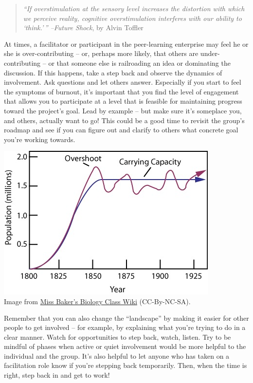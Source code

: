 \begin{quote}
\emph{``If overstimulation at the sensory level increases the distortion
with which we perceive reality, cognitive overstimulation interferes
with our ability to `think.'\,'' --}\emph{Future Shock}, by Alvin
Toffler
\end{quote}

At times, a facilitator or participant in the peer-learning enterprise
may feel he or she is over-contributing -- or, perhaps more likely, that
others are under-contributing -- or that someone else is railroading an
idea or dominating the discussion. If this happens, take a step back and
observe the dynamics of involvement. Ask questions and let others
answer. Especially if you start to feel the symptoms of burnout, it's
important that you find the level of engagement that allows you to
participate at a level that is feasible for maintaining progress toward
the project's goal. Lead by example -- but make sure it's someplace you,
and others, actually want to go! This could be a good time to revisit
the group's roadmap and see if you can figure out and clarify to others
what concrete goal you're working towards. 

\begin{center}
\includegraphics[width=.65\textwidth]{../pictures/carrying_capacity.jpg} \\
Image from
\href{http://missbakersbiologyclasswiki.wikispaces.com/Ecology+Study+Guide}{Miss
Baker's Biology Class Wiki} (CC-By-NC-SA).
\end{center}

Remember that you can also change the ``landscape'' by making it
easier for other people to get involved -- for example, by explaining
what you're trying to do in a clear manner. Watch for opportunities to
step back, watch, listen. Try to be mindful of phases when active or
quiet involvement would be more helpful to the individual and the
group. It's also helpful to let anyone who has taken on a facilitation
role know if you're stepping back temporarily. Then, when the time is
right, step back in and get to work!
